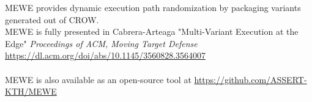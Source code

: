 



\begin{tcolorbox}[title=Contribution paper and artifact,boxrule=1pt,arc=.2em,boxsep=1.0mm]
  MEWE provides dynamic execution path randomization by packaging variants generated out of CROW.\\
  MEWE is fully presented in Cabrera-Arteaga \etal "Multi-Variant Execution at the Edge"
  \emph{Proceedings of ACM, Moving Target Defense}
 \url{https://dl.acm.org/doi/abs/10.1145/3560828.3564007}
 \\\\
 MEWE is also available as an open-source tool at \url{https://github.com/ASSERT-KTH/MEWE}
\end{tcolorbox}